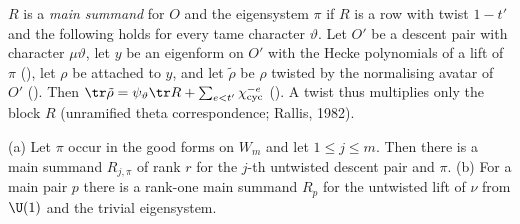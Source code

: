 \begin{definition}\label{cg-selmer:def:summand}
$R$ is a \emph{main summand} for $O$ and the eigensystem $\pi$ if $R$ is a row with twist $1-t'$ and the
following holds for every tame character $\vartheta$. Let $O'$ be a descent pair with character
$\mu\vartheta$, let $y$ be an eigenform on $O'$ with the Hecke polynomials of a lift of $\pi$
(), let $\rho$ be attached to $y$, and let $\tilde\rho$ be
$\rho$ twisted by the normalising avatar of $O'$ (). Then
$\tr\tilde\rho=\psi_\vartheta\tr R+\sum_{e<t'}\chi_{\mathrm{cyc}}^{-e}$ (). A twist thus
multiplies only the block $R$ (unramified theta correspondence; Rallis, 1982).
\end{definition}

\begin{proposition}\label{cg-selmer:prop:rows}
(a) Let $\pi$ occur in the good forms on $W_m$ and let $1\le j\le m$. Then there is a main summand
$R_{j,\pi}$ of rank $r$ for the $j$-th untwisted descent pair and $\pi$. (b) For a main pair $p$ there
is a rank-one main summand $R_p$ for the untwisted lift of $\nu$ from $\U(1)$ and the trivial
eigensystem.
\end{proposition}

